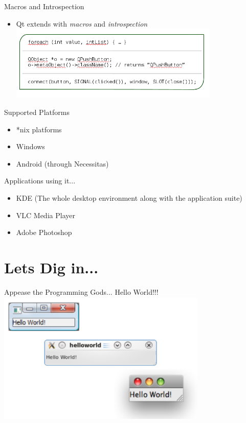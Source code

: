 \documentclass{beamer}
\begin{document}
\begin{frame}{Macros and Introspection}
\pause
\begin{itemize}
\item Qt extends with \textit{macros} and \textit{introspection}
\includegraphics[width=10cm]{macros.png}
\end{itemize}
\end{frame}

\begin{frame}{Supported Platforms}
\pause
\begin{itemize}
\item *nix platforms
\item Windows
\item Android (through Necessitas)
\end{itemize}
\end{frame}

\begin{frame}{Applications using it...}
\pause
\begin{itemize}
\item KDE (The whole desktop environment along with the application suite)
\item VLC Media Player
\item Adobe Photoshop
\end{itemize}
\end{frame}

\section{Lets Dig in...}
\begin{frame}{Appease the Programming Gods...}
Hello World!!!
\includegraphics[width=10cm]{helloworld.png}
\end{frame}
\end{document}

